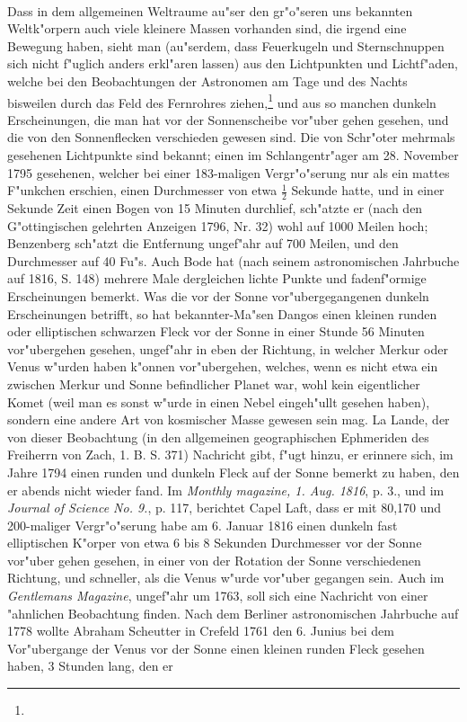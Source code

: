 \documentclass[a4paper, 11pt, oneside, polutonikogreek, german]{article}
\begin{document}
\paragraph{}
Dass in dem allgemeinen Weltraume au"ser den gr"o"seren uns bekannten Weltk"orpern auch viele kleinere Massen vorhanden sind, die irgend eine Bewegung haben, sieht man (au"serdem, dass Feuerkugeln und Sternschnuppen sich nicht f"uglich anders erkl"aren lassen) aus den Lichtpunkten und Lichtf"aden, welche bei den Beobachtungen der Astronomen am Tage und des Nachts bisweilen durch das Feld des Fernrohres ziehen,\footnote{} und aus so manchen dunkeln Erscheinungen, die man hat vor der Sonnenscheibe vor"uber gehen gesehen, und die von den Sonnenflecken verschieden gewesen sind. Die von Schr"oter mehrmals gesehenen Lichtpunkte sind bekannt; einen im Schlangentr"ager am 28. November 1795 gesehenen, welcher bei einer 183-maligen Vergr"o"serung nur als ein mattes F"unkchen erschien, einen Durchmesser von etwa $\mathfrak{\frac{1}{2}}$ Sekunde hatte, und in einer Sekunde Zeit einen Bogen von 15 Minuten durchlief, sch"atzte er (nach den G"ottingischen gelehrten Anzeigen 1796, Nr. 32) wohl auf 1000 Meilen hoch; Benzenberg sch"atzt die Entfernung ungef"ahr auf 700 Meilen, und den Durchmesser auf 40 Fu"s. Auch Bode hat (nach seinem astronomischen Jahrbuche auf 1816, S. 148) mehrere Male dergleichen lichte Punkte und fadenf"ormige Erscheinungen bemerkt. Was die vor der Sonne vor"ubergegangenen dunkeln Erscheinungen betrifft, so hat bekannter-Ma"sen Dangos einen kleinen runden oder elliptischen schwarzen Fleck vor der Sonne in einer Stunde 56 Minuten vor"ubergehen gesehen, ungef"ahr in eben der Richtung, in welcher Merkur oder Venus w"urden haben k"onnen vor"ubergehen, welches, wenn es nicht etwa ein zwischen Merkur und Sonne befindlicher Planet war, wohl kein eigentlicher Komet (weil man es sonst w"urde in einen Nebel eingeh"ullt gesehen haben), sondern eine andere Art von kosmischer Masse gewesen sein mag. La Lande, der von dieser Beobachtung (in den allgemeinen geographischen Ephmeriden des Freiherrn von Zach, 1. B. S. 371) Nachricht gibt, f"ugt hinzu, er erinnere sich, im Jahre 1794 einen runden und dunkeln Fleck auf der Sonne bemerkt zu haben, den er abends nicht wieder fand. Im \emph{Monthly magazine, 1. Aug. 1816}, p. 3., und im \emph{Journal of Science No. 9.}, p. 117, berichtet Capel Laft, dass er mit 80,170 und 200-maliger Vergr"o"serung habe am 6. Januar 1816 einen dunkeln fast elliptischen K"orper von etwa 6 bis 8 Sekunden Durchmesser vor der Sonne vor"uber gehen gesehen, in einer von der Rotation der Sonne verschiedenen Richtung, und schneller, als die Venus w"urde vor"uber gegangen sein. Auch im \emph{Gentlemans Magazine}, ungef"ahr um 1763, soll sich eine Nachricht von einer "ahnlichen Beobachtung finden. Nach dem Berliner astronomischen Jahrbuche auf 1778 wollte Abraham Scheutter in Crefeld 1761 den 6. Junius bei dem Vor"ubergange der Venus vor der Sonne einen kleinen runden Fleck gesehen haben, 3 Stunden lang, den er 
\end{document}
